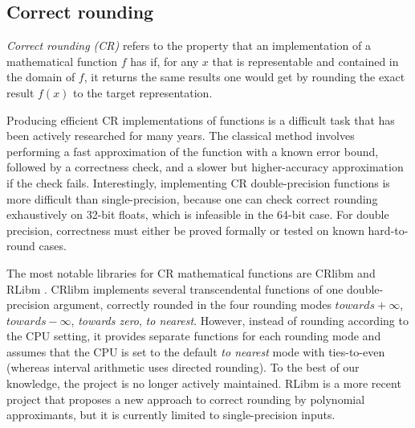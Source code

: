 \subsection{Correct rounding}
\emph{Correct rounding (CR)} refers to the property that an implementation
of a mathematical function $f$ has if, for any $x$ that is representable and contained in the domain of $f$, it returns the same results one would get by rounding the exact result $f(x)$ to the target representation.

Producing efficient CR implementations of functions is a difficult task that has been actively researched for many years.
The classical method involves performing a fast approximation of the function with a known error bound, followed by a correctness check, and a slower but higher-accuracy approximation if the check fails.
Interestingly, implementing CR double-precision functions is more difficult than single-precision, because one can check correct rounding exhaustively on 32-bit floats, which is infeasible in the 64-bit case.
For double precision, correctness must either be proved formally or tested on known hard-to-round cases.

The most notable libraries for CR mathematical functions are CRlibm \cite{crlibm} and RLibm \cite{rlibm}.
CRlibm implements several transcendental functions of one double-precision argument, correctly rounded in the four rounding modes $towards +\infty$, $towards -\infty$, \emph{towards zero}, \emph{to nearest}. However, instead of rounding according to the CPU setting, it provides separate functions for each rounding mode and  assumes that the CPU is set to the default \emph{to nearest} mode with ties-to-even (whereas interval arithmetic uses directed rounding).
To the best of our knowledge, the project is no longer actively maintained.
RLibm is a more recent project that proposes a new approach to correct rounding by polynomial approximants, but it is currently limited to single-precision inputs.

